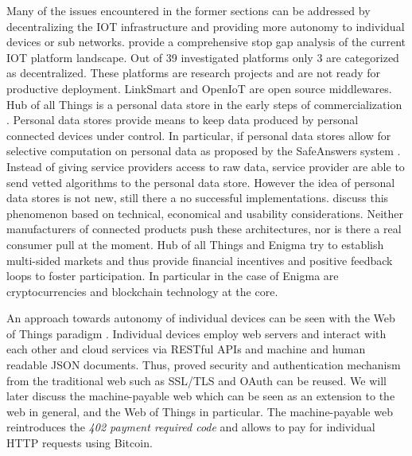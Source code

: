 Many of the issues encountered in the former sections can be addressed by decentralizing the \ac{IOT} infrastructure and providing more autonomy to individual devices or sub networks. \cite{ISI:000379632700002} provide a comprehensive stop gap analysis of the current \ac{IOT} platform landscape. Out of 39 investigated platforms only 3 are categorized as decentralized. These platforms are research projects and are not ready for productive deployment. LinkSmart and OpenIoT are open source middlewares. Hub of all Things is a personal data store in the early steps of commercialization \parencite{ng2014engineering}. Personal data stores provide means to keep data produced by personal connected devices under control. In particular, if personal data stores allow for selective computation on personal data as proposed by the SafeAnswers system \parencite{10.1371/journal.pone.0098790}. Instead of giving service providers access to raw data, service provider are able to send vetted algorithms to the personal data store. However the idea of personal data stores is not new, still there a no successful implementations. \cite{DBLP:journals/corr/abs-1202-4503} discuss this phenomenon based on technical, economical and usability considerations. Neither manufacturers of connected products push these architectures, nor is there a real consumer pull at the moment. Hub of all Things and Enigma \parencite{7163223} try to establish multi-sided markets and thus provide financial incentives and positive feedback loops to foster participation. In particular in the case of Enigma are cryptocurrencies and blockchain technology at the core.

An approach towards autonomy of individual devices can be seen with the Web of Things paradigm \parencite{Guinard2011}. Individual devices employ web servers and interact with each other and cloud services via \ac{REST}ful \ac{API}s and machine and human readable \ac{JSON} documents. Thus, proved security and authentication mechanism from the traditional web such as \ac{SSL}/\ac{TLS} and OAuth \parencite{Leiba2012} can be reused. We will later discuss the machine-payable web which can be seen as an extension to the web in general, and the Web of Things in particular. The machine-payable web reintroduces the \emph{402 payment required code} and allows to pay for individual \ac{HTTP} requests using Bitcoin. 

